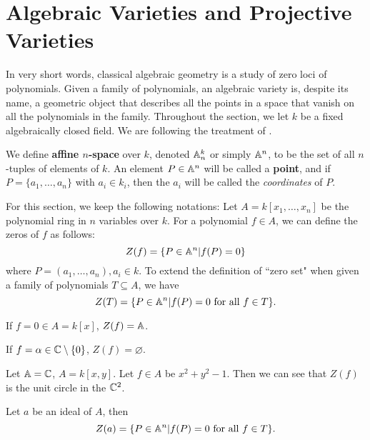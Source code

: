 \section{Algebraic Varieties and Projective Varieties} 
\label{sec:algebraic-varieties-and-projective-varieties}
   In very short words, classical algebraic geometry is a study of zero loci of polynomials. 
   Given a family of polynomials, 
   an algebraic variety is, despite its name, a geometric object 
   that describes all the points in a space that vanish on 
   all the polynomials in the family.
   Throughout the section, 
   we let $k$ be a fixed algebraically closed field.
   We are following the treatment of \citet{Hartshorne1977}.
   
   \begin{definition}
	We define \textbf{affine $n$-space} over $k$,
	denoted $\mathbb{A}_n^k$ or simply $\mathbb{A}^n$,
	to be the set of all $n$-tuples of elements of $k$.
	An element $P \in \mathbb{A}^n$ will be called a \textbf{point},
	and if $P = \{a_1, \ldots, a_n\}$ with $a_i \in k_i$,
	then the $a_i$ will be called the \emph{coordinates} of $P$.
   \end{definition}
   
   For this section, we keep the following notations:
   Let $A = k[x_1, \ldots, x_n]$ be the polynomial ring in $n$ variables 
   over $k$.
   For a polynomial $f \in A$, we can define the zeros of $f$ as follows:
   \[
   Z(f) = \{P \in \mathbb{A}^n | f(P) = 0\}
   \] where $P = (a_1, \ldots, a_n), a_i \in k$.
   To extend the definition of ``zero set" when given a family 
   of polynomials $T \subseteq A$,
   we have 
   \[
   Z(T)  = \{P \in \mathbb{A}^n | f(P) = 0 \text{ for all } f \in T\}. 
   \]
   
   \begin{example}
   	If $f = 0 \in A = k[x]$, $Z(f) = \mathbb{A}$. 
   \end{example}
   
   \begin{example}
   	If $f = \alpha \in \mathbb{C} \setminus \{0\}$, $Z(f) = \varnothing$. 
   \end{example}
   
   \begin{example}
   	Let $\mathbb{A} = \mathbb{C}$, $A = k[x, y]$.
	Let $f \in A$ be $x^2 + y^2 - 1$.
	Then we can see that $Z(f)$ is the unit circle in the $\mathbb{C}^2$.
   \end{example}
   
   \begin{example}
   	Let $a$ be an ideal of $A$, then 
	\[
	Z(a) = \{P \in \mathbb{A}^n | f(P) = 0 \text{ for all } f \in T\}. 
	\]
   \end{example}
   
